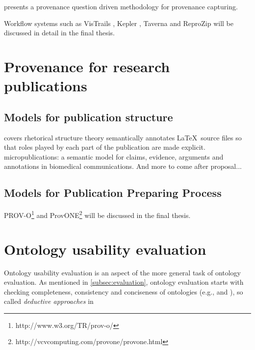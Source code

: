 \cite{miles2011prime} presents a provenance question driven methodology for provenance capturing.

Workflow systems such as VisTrails \cite{freire2014reproducibility}, Kepler \cite{ludascher2006scientific}, Taverna \cite{wolstencroft2013taverna} and ReproZip \cite{chirigati2013reprozip} will be discussed in detail in the final thesis.

\section{Provenance for research publications}
\subsection{Models for publication structure}
\cite{taboada2006rhetorical} covers rhetorical structure theory
\cite{groza2007salt} semantically annotates \LaTeX \ source files so that roles played by each part of the publication are made explicit.
\cite{clark2013micropublications} micropublications: a semantic model for claims, evidence, arguments and annotations in biomedical communications.
And more to come after proposal...

\subsection{Models for Publication Preparing Process}
PROV-O\footnote{http://www.w3.org/TR/prov-o/} and ProvONE\footnote{http://vcvcomputing.com/provone/provone.html} will be discussed in the final thesis.

\section{Ontology usability evaluation}
Ontology usability evaluation is an aspect of the more general task of ontology evaluation. As mentioned in \ref{subsec:evaluation}, ontology evaluation starts with checking completeness, consistency and conciseness of ontologies (e.g., \cite{gruninger1995methodology} and \cite{gomez2001evaluation}), so called \emph{deductive approaches} in 

